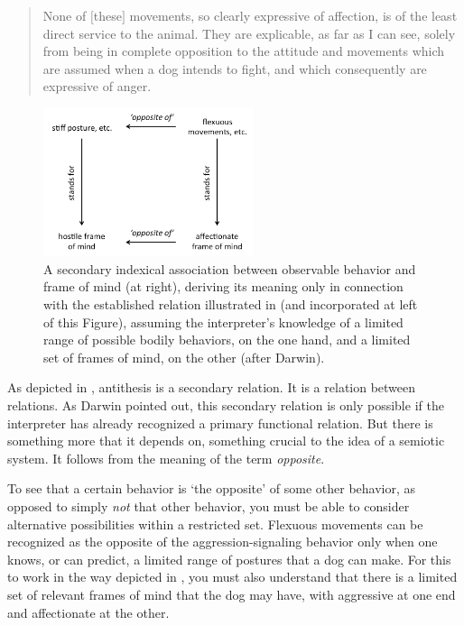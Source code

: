 \begin{quotation}
None of $[$these$]$ movements, so clearly expressive of 
affection, is of the least direct service to the animal. They are 
explicable, as far as I can see, solely from being in complete 
opposition to the attitude and movements which are assumed when a dog 
intends to fight, and which consequently are expressive of anger. 
\citep[15--16]{darwin_expression_1872} 
\end{quotation}


\begin{figure}[h]
\includegraphics[width=0.55\textwidth,keepaspectratio]{figures/Fig04}
\caption{A secondary indexical association between observable behavior 
and frame of mind (at right), deriving its meaning only in connection 
with the established relation illustrated in  (and incorporated 
at left of this Figure), assuming the interpreter's knowledge of a 
limited range of possible bodily behaviors, on the one hand, and a 
limited set of frames of mind, on the other (after Darwin).}
\label{secondaryassoc}
\end{figure}

As depicted in , antithesis is a secondary relation. It is a relation between relations. As Darwin 
pointed out, this secondary relation is only possible if the interpreter has already recognized a primary functional relation. But there is something 
more that it depends on, something crucial to the idea of a semiotic 
system. It follows from the meaning of the term \textit{opposite}. 



To see that a certain behavior is `the opposite' of some 
other behavior, as opposed to simply \textit{not} that other behavior, 
you must be able to consider alternative possibilities within a 
restricted set. Flexuous movements can be recognized as the opposite of 
the aggression-signaling behavior only when one knows, or can predict, a 
limited range of postures that a dog can make. For this to work in 
the way depicted in , you must also understand that there is a 
limited set of relevant frames of mind that the dog may have, with aggressive at one end and affectionate at the other. 



